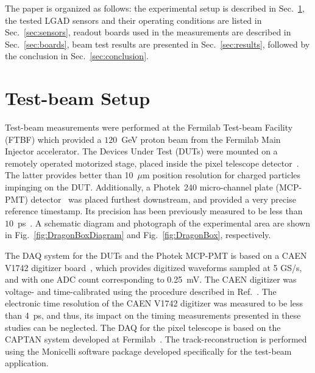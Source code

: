 \documentclass[preprint,1p]{elsarticle}
\begin{document}
The paper is organized as follows: the experimental setup is described in
Sec.~\ref{sec:setup}, the tested LGAD sensors and their operating conditions are
listed in Sec.~\ref{sec:sensors}, readout boards used in the measurements are described in Sec.~\ref{sec:boards}, beam test results are presented in Sec.~\ref{sec:results}, followed by the conclusion in Sec.~\ref{sec:conclusion}.

\section{Test-beam Setup} 
\label{sec:setup}


Test-beam measurements were performed at the Fermilab Test-beam Facility (FTBF)
which provided a $120$~GeV proton beam from the Fermilab Main Injector
accelerator. The Devices Under Test (DUTs) were mounted on a remotely operated
motorized stage, placed inside the pixel telescope detector~\cite{KWAN2016162}.
The latter provides better than 10~$\mu$m position resolution for charged
particles impinging on the DUT. Additionally, a Photek~240 micro-channel plate
(MCP-PMT) detector~\cite{Anderson:2015gha, MCPFastCaloNIMA,
Ronzhin2015288,Ronzhin201552} was placed furthest downstream, and provided a
very precise reference timestamp. Its precision has been previously
measured to be less than $10$~ps~\cite{Ronzhin2015288}. A schematic diagram and
photograph of the experimental area are shown in Fig.~\ref{fig:DragonBoxDiagram}
and Fig.~\ref{fig:DragonBox}, respectively. 

The DAQ system for the DUTs and the Photek MCP-PMT is based on a CAEN V1742
digitizer board~\cite{CAENDRS}, which provides digitized waveforms sampled at 5
GS/s, and with one ADC count corresponding to 0.25~mV. The CAEN digitizer was
voltage- and time-calibrated using the procedure described in
Ref.~\cite{Kim201467}. The electronic time resolution of the CAEN V1742
digitizer was measured to be less than 4~ps, and thus, its impact on the timing
measurements presented in these studies can be neglected. The DAQ for the pixel
telescope is based on the CAPTAN system developed at
Fermilab~\cite{KWAN2016162}. The track-reconstruction is performed using the
Monicelli software package developed specifically for the test-beam application. 
\end{document}
